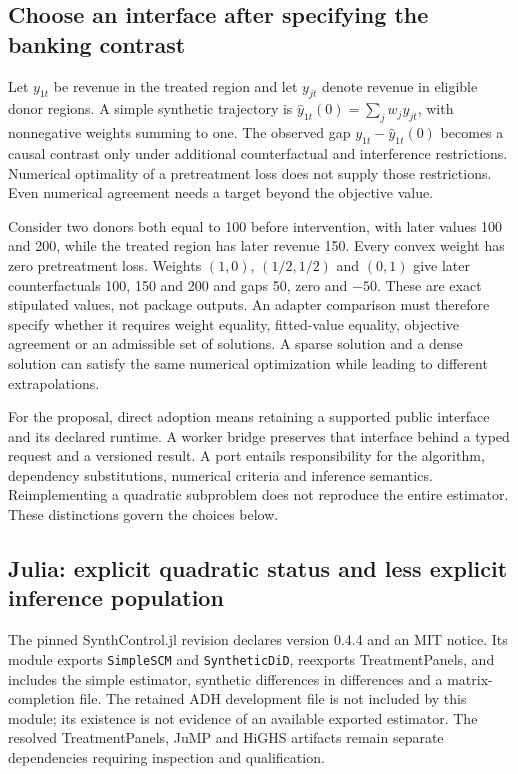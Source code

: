 \subsection{Choose an interface after specifying the banking contrast}
Let $y_{1t}$ be revenue in the treated region and let $y_{jt}$ denote revenue
in eligible donor regions. A simple synthetic trajectory is
$\widehat y_{1t}(0)=\sum_j w_jy_{jt}$, with nonnegative weights summing to one.
The observed gap $y_{1t}-\widehat y_{1t}(0)$ becomes a causal contrast only
under additional counterfactual and interference restrictions. Numerical
optimality of a pretreatment loss does not supply those restrictions.
Even numerical agreement needs a target beyond the objective value.
\citep{exec25_synthcross_choice}

Consider two donors both equal to 100 before intervention, with later values
100 and 200, while the treated region has later revenue 150. Every convex
weight has zero pretreatment loss. Weights $(1,0)$, $(1/2,1/2)$ and $(0,1)$
give later counterfactuals 100, 150 and 200 and gaps 50, zero and $-50$.
These are exact stipulated values, not package outputs. An adapter comparison
must therefore specify whether it requires weight equality, fitted-value
equality, objective agreement or an admissible set of solutions. A sparse
solution and a dense solution can satisfy the same numerical optimization
while leading to different extrapolations.~\citep{exec25_synthcross_choice}

For the proposal, direct adoption means retaining a supported public
interface and its declared runtime. A worker bridge preserves that interface
behind a typed request and a versioned result. A port entails responsibility
for the algorithm, dependency substitutions, numerical criteria and inference
semantics. Reimplementing a quadratic subproblem does not reproduce the
entire estimator. These distinctions govern the choices below.
\citep{exec25_synthcross_choice}

\subsection{Julia: explicit quadratic status and less explicit inference population}
The pinned SynthControl.jl revision declares version 0.4.4 and an MIT notice.
Its module exports \texttt{SimpleSCM} and \texttt{SyntheticDiD}, reexports
TreatmentPanels, and includes the simple estimator, synthetic differences
in differences and a matrix-completion file. The retained ADH development
file is not included by this module; its existence is not evidence of an
available exported estimator. The resolved TreatmentPanels, JuMP and HiGHS
artifacts remain separate dependencies requiring inspection and qualification.
\citep{exec25_synthcross_julia}

